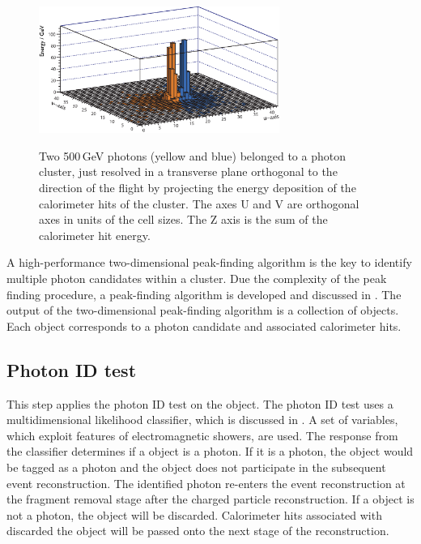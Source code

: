 
\begin{figure}[tbph]
\centering
{\includegraphics[width=0.7\textwidth]{photon/peakFindingMod}}
\caption[Example of projecting a large photon cluster containing two photons.]
{Two 500\,GeV photons (yellow and blue) belonged to  a photon cluster, just resolved in a transverse plane orthogonal to the direction of the flight  by projecting the energy deposition of the calorimeter hits of the cluster. The axes U and V are orthogonal axes in units of the \ECAL cell sizes. The Z axis is the sum of the calorimeter hit energy.}
\label{fig:photonPeakFinding}
\end{figure}

A high-performance two-dimensional peak-finding algorithm is the key to identify multiple photon candidates within a cluster. Due the complexity of the peak finding procedure, a peak-finding algorithm is developed and discussed in . The output of the two-dimensional peak-finding algorithm is a collection of \ShowerPeak objects. Each \ShowerPeak object corresponds to a photon candidate and associated calorimeter hits.

\subsection{Photon ID test}
\label{sec:photonIDtest}

This step applies the photon ID test on the \ShowerPeak object. The photon ID test uses  a multidimensional likelihood classifier, which is discussed in . A set of variables, which exploit features of electromagnetic showers, are used. The response from the classifier determines if a \ShowerPeak object is a photon. If it is a photon, the \ShowerPeak object would be tagged as a photon and the \ShowerPeak object  does not participate in the subsequent event reconstruction. The identified photon re-enters the event reconstruction at the fragment removal stage after the charged particle reconstruction. If a \ShowerPeak object  is not a photon, the \ShowerPeak object  will be discarded. Calorimeter hits associated with discarded the \ShowerPeak object will be passed onto the next stage of the reconstruction.



